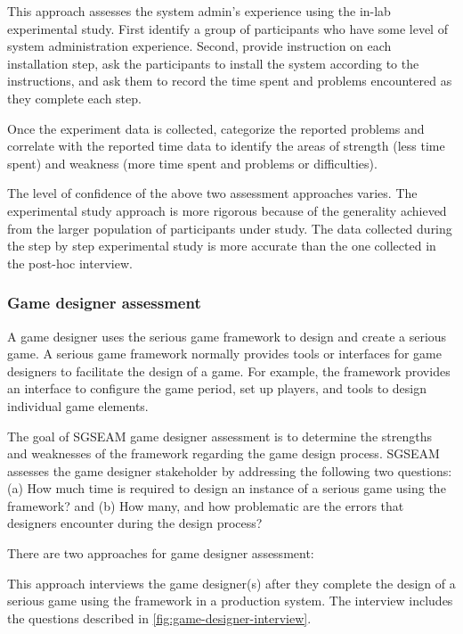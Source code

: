 \label{In-lab system admin study}

This approach assesses the system admin's experience using the in-lab experimental study. First identify a group 
of participants who have some level of system administration experience. Second, provide instruction on 
each installation step, ask the participants to install the system according to the instructions, and ask them to record 
the time spent and problems encountered as they complete each step.

Once the experiment data is collected, categorize the reported problems and correlate with the reported time data 
to identify the areas of strength (less time spent) and weakness (more time spent and problems or difficulties). 

The level of confidence of the above two assessment approaches varies. The experimental study
approach is more rigorous because of the generality achieved from the larger population of
participants under study. The data collected during the step by step experimental study is more
accurate than the one collected in the post-hoc interview.

\subsubsection{Game designer assessment}

A game designer uses the serious game framework to design and create a serious game.
A serious game framework normally provides tools or interfaces for game designers
to facilitate the design of a game. For example, the framework provides an interface to configure the game period, set up 
players, and tools to design individual game elements.

The goal of SGSEAM game designer assessment is to determine the strengths and weaknesses of the framework 
regarding the game design process. SGSEAM assesses the game designer stakeholder by addressing the following 
two questions: (a) How much time is required to design an instance of a serious game using the framework? and (b) How
many, and how problematic are the errors that designers encounter during the design process?

There are two approaches for game designer assessment:

\label{Post-hoc game designer interview}

This approach interviews the game designer(s) after they complete the design of a serious game using the 
framework in a production system. The interview includes the questions described in \autoref{fig:game-designer-interview}.
 
